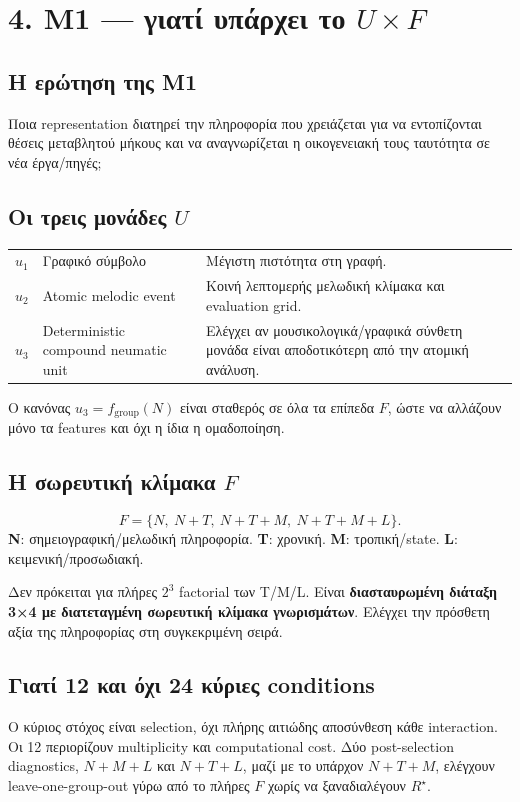\documentclass[9pt,a4paper]{extarticle}
\begin{document}
\section*{4. M1 — γιατί υπάρχει το \(U\times F\)}

\subsection*{Η ερώτηση της M1}
Ποια representation διατηρεί την πληροφορία που χρειάζεται για να εντοπίζονται θέσεις μεταβλητού μήκους και να αναγνωρίζεται η οικογενειακή τους ταυτότητα σε νέα έργα/πηγές;

\subsection*{Οι τρεις μονάδες \(U\)}
\begin{tabularx}{\linewidth}{>{\bfseries}p{1.2cm}p{3.7cm}X}
\(u_1\) & Γραφικό σύμβολο & Μέγιστη πιστότητα στη γραφή.\\
\(u_2\) & Atomic melodic event & Κοινή λεπτομερής μελωδική κλίμακα και evaluation grid.\\
\(u_3\) & Deterministic compound neumatic unit & Ελέγχει αν μουσικολογικά/γραφικά σύνθετη μονάδα είναι αποδοτικότερη από την ατομική ανάλυση.\\
\end{tabularx}

Ο κανόνας \(u_3=f_{\mathrm{group}}(N)\) είναι σταθερός σε όλα τα επίπεδα \(F\), ώστε να αλλάζουν μόνο τα features και όχι η ίδια η ομαδοποίηση.

\subsection*{Η σωρευτική κλίμακα \(F\)}
\[
F=\{N,\ N+T,\ N+T+M,\ N+T+M+L\}.
\]
\textbf{N}: σημειογραφική/μελωδική πληροφορία. \textbf{T}: χρονική. \textbf{M}: τροπική/state. \textbf{L}: κειμενική/προσωδιακή.

Δεν πρόκειται για πλήρες \(2^3\) factorial των T/M/L. Είναι \textbf{διασταυρωμένη διάταξη 3×4 με διατεταγμένη σωρευτική κλίμακα γνωρισμάτων}. Ελέγχει την πρόσθετη αξία της πληροφορίας στη συγκεκριμένη σειρά.

\subsection*{Γιατί 12 και όχι 24 κύριες conditions}
Ο κύριος στόχος είναι selection, όχι πλήρης αιτιώδης αποσύνθεση κάθε interaction. Οι 12 περιορίζουν multiplicity και computational cost. Δύο post-selection diagnostics, \(N+M+L\) και \(N+T+L\), μαζί με το υπάρχον \(N+T+M\), ελέγχουν leave-one-group-out γύρω από το πλήρες \(F\) χωρίς να ξαναδιαλέγουν \(R^\star\).
\end{document}
